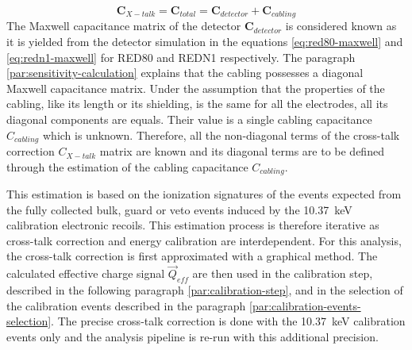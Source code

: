 \begin{equation}
\bm{C}_{X-talk} = \bm{C}_{total} = \bm{C}_{detector} + \bm{C}_{cabling} 
\end{equation}
The Maxwell capacitance matrix of the detector $\bm{C}_{detector}$ is considered known as it is yielded from the detector simulation in the equations \ref{eq:red80-maxwell} and \ref{eq:redn1-maxwell} for RED80 and REDN1 respectively.
The paragraph \ref{par:sensitivity-calculation} explains that the cabling possesses a diagonal Maxwell capacitance matrix. Under the assumption that the properties of the cabling, like its length or its shielding, is the same for all the electrodes, all its diagonal components are equals. Their value is a single cabling capacitance $C_{cabling}$ which is unknown.
Therefore, all the non-diagonal terms of the cross-talk correction $C_{X-talk}$ matrix are known and its diagonal terms are to be defined through the estimation of the cabling capacitance $C_{cabling}$.

This estimation is based on the ionization signatures of the events expected from the fully collected bulk, guard or veto events induced by the \SI{10.37}{\kilo\eV} calibration electronic recoils. This estimation process is therefore iterative as cross-talk correction and energy calibration are interdependent. 
For this analysis, the cross-talk correction is first approximated with a graphical method. The calculated effective charge signal $\vec{Q}_{eff}$ are then used in the calibration step, described in the following paragraph \ref{par:calibration-step}, and in the selection of the calibration events described in the paragraph \ref{par:calibration-events-selection}. The precise cross-talk correction is done with the \SI{10.37}{\kilo\eV} calibration events only and the analysis pipeline is re-run with this additional precision.


